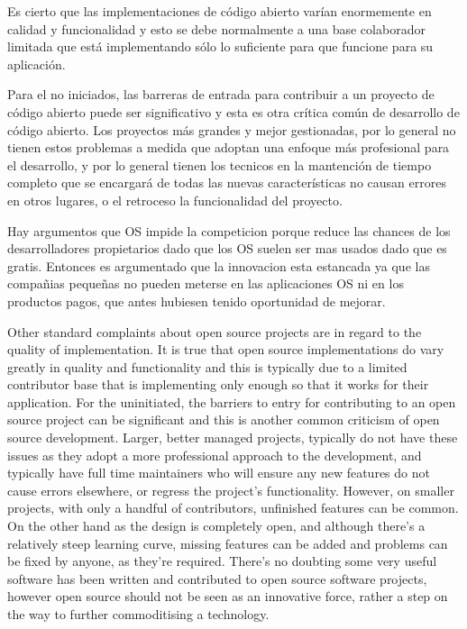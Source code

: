 
Es cierto que las implementaciones de código abierto varían enormemente
en calidad y funcionalidad y esto se debe normalmente a una base colaborador limitada que está implementando sólo lo suficiente para que funcione para su aplicación. 

Para el no iniciados, las barreras de entrada para contribuir a un proyecto de código abierto puede
ser significativo y esta es otra crítica común de desarrollo de código abierto.
Los proyectos más grandes y mejor gestionadas, por lo general no tienen estos problemas a medida que adoptan una
enfoque más profesional para el desarrollo, y por lo general tienen los tecnicos en la mantención de tiempo completo
que se encargará de todas las nuevas características no causan errores en otros lugares, o el retroceso
la funcionalidad del proyecto.

Hay argumentos que OS impide la competicion porque reduce las chances de los desarrolladores propietarios dado que los OS suelen ser mas usados dado que es gratis. Entonces es argumentado que la innovacion esta estancada ya que las compañias pequeñas no pueden meterse en las aplicaciones OS ni en los productos pagos, que antes hubiesen tenido oportunidad de mejorar.

Other standard complaints about open source projects are in regard to the quality
of implementation. It is true that open source implementations do vary greatly
in quality and functionality and this is typically due to a limited contributor base
that is implementing only enough so that it works for their application. For the
uninitiated, the barriers to entry for contributing to an open source project can
be significant and this is another common criticism of open source development.
Larger, better managed projects, typically do not have these issues as they adopt a
more professional approach to the development, and typically have full time maintainers
who will ensure any new features do not cause errors elsewhere, or regress
the project’s functionality. However, on smaller projects, with only a handful of
contributors, unfinished features can be common. On the other hand as the design
is completely open, and although there’s a relatively steep learning curve, missing
features can be added and problems can be fixed by anyone, as they’re required.
There’s no doubting some very useful software has been written and contributed
to open source software projects, however open source should not be seen as an innovative
force, rather a step on the way to further commoditising a technology.

